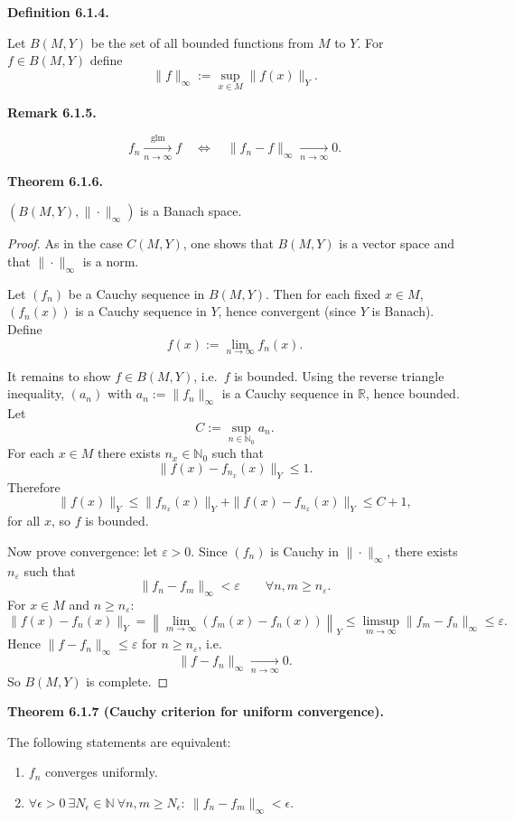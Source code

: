 \documentclass[12pt]{article}
\newenvironment{satz}[1]{%
  \par\vspace{6pt}\noindent\textbf{Theorem #1.}\itshape\space
}{%
  \par\vspace{6pt}
}
\newenvironment{definition}[1]{%
  \par\vspace{6pt}\noindent\textbf{Definition #1.}\itshape\space
}{%
  \par\vspace{6pt}
}
\newenvironment{bemerkung}[1]{%
  \par\vspace{6pt}\noindent\textbf{Remark #1.}\itshape\space
}{%
  \par\vspace{6pt}
}
\begin{document}
\begin{definition}{6.1.4}
Let $B(M,Y)$ be the set of all bounded functions from $M$ to $Y$.  
For $f \in B(M,Y)$ define
\[
\|f\|_\infty := \sup_{x\in M}\|f(x)\|_Y .
\]
\end{definition}

\begin{bemerkung}{6.1.5}
\[
f_n \xrightarrow[n\to\infty]{\mathrm{glm}} f
\quad\Longleftrightarrow\quad
\|f_n-f\|_\infty \xrightarrow[n\to\infty]{} 0.
\]
\end{bemerkung}

\begin{satz}{6.1.6}
$(B(M,Y),\|\cdot\|_\infty)$ is a Banach space.
\end{satz}

\begin{proof}
As in the case $C(M,Y)$, one shows that $B(M,Y)$ is a vector space and that $\|\cdot\|_\infty$ is a norm.

Let $(f_n)$ be a Cauchy sequence in $B(M,Y)$. Then for each fixed $x\in M$, $(f_n(x))$ is a Cauchy sequence in $Y$, hence convergent (since $Y$ is Banach). Define
\[
f(x):=\lim_{n\to\infty}f_n(x).
\]

It remains to show $f\in B(M,Y)$, i.e.\ $f$ is bounded.  
Using the reverse triangle inequality, $(a_n)$ with $a_n:=\|f_n\|_\infty$ is a Cauchy sequence in $\mathbb R$, hence bounded. Let
\[
C:=\sup_{n\in\mathbb N_0} a_n.
\]
For each $x\in M$ there exists $n_x\in\mathbb N_0$ such that
\[
\|f(x)-f_{n_x}(x)\|_Y\le 1.
\]
Therefore
\[
\|f(x)\|_Y
\le
\|f_{n_x}(x)\|_Y+\|f(x)-f_{n_x}(x)\|_Y
\le C+1,
\]
for all $x$, so $f$ is bounded.

Now prove convergence: let $\varepsilon>0$. Since $(f_n)$ is Cauchy in $\|\cdot\|_\infty$, there exists $n_\varepsilon$ such that
\[
\|f_n-f_m\|_\infty<\varepsilon
\qquad \forall n,m\ge n_\varepsilon.
\]
For $x\in M$ and $n\ge n_\varepsilon$:
\[
\|f(x)-f_n(x)\|_Y
=
\left\|\lim_{m\to\infty}(f_m(x)-f_n(x))\right\|_Y
\le
\limsup_{m\to\infty}\|f_m-f_n\|_\infty
\le \varepsilon.
\]
Hence $\|f-f_n\|_\infty\le\varepsilon$ for $n\ge n_\varepsilon$, i.e.
\[
\|f-f_n\|_\infty \xrightarrow[n\to\infty]{} 0.
\]
So $B(M,Y)$ is complete.
\end{proof}

\begin{satz}{6.1.7 (Cauchy criterion for uniform convergence)}
The following statements are equivalent:
\begin{enumerate}
    \item $f_n$ converges uniformly.
    \item $\forall \epsilon>0\ \exists N_\epsilon\in\mathbb N\ \forall n,m\ge N_\epsilon:\ \|f_n-f_m\|_\infty<\epsilon$.
\end{enumerate}
\end{satz}
\end{document}
